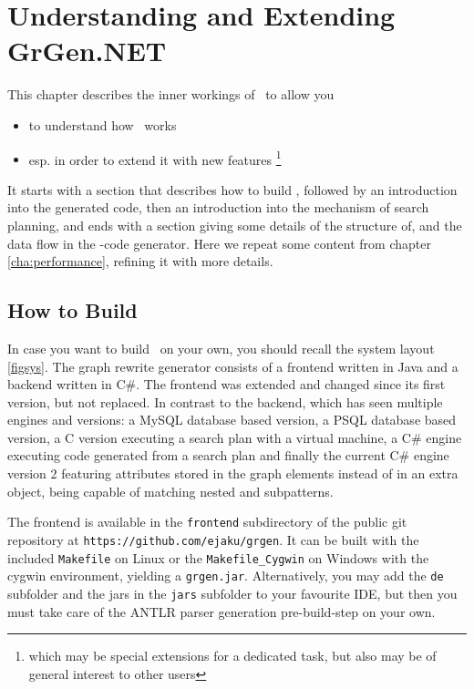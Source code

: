 \chapter{Understanding and Extending GrGen.NET} \label{cha:developing}

This chapter describes the inner workings of \GrG~to allow you
\begin{itemize}
\item to understand how \GrG~works
\item esp. in order to extend it with new features
\footnote{which may be special extensions for a dedicated task, but also may be of general interest to other users}
\end{itemize}
It starts with a section that describes how to build \GrG, followed by an introduction into the generated code, then an introduction into the mechanism of search planning, and ends with a section giving some details of the structure of, and the data flow in the \GrG-code generator.
Here we repeat some content from chapter \ref{cha:performance}, refining it with more details.

\section{How to Build}\label{sub:building}

In case you want to build \GrG~on your own, you should recall the system layout \ref{figsys}. 
The graph rewrite generator consists of a frontend written in Java and a backend written in C\#.
The frontend was extended and changed since its first version, but not replaced.
In contrast to the backend, which has seen multiple engines and versions: a MySQL database based version, a PSQL database based version, 
a C version executing a search plan with a virtual machine, a C\# engine executing code generated from a search plan and finally the current C\# engine version 2 featuring attributes stored in the graph elements instead of in an extra object, being capable of matching nested and subpatterns.

The frontend is available in the \texttt{frontend} subdirectory of the public git repository at \texttt{https://github.com/ejaku/grgen}.
It can be built with the included \texttt{Makefile} on Linux or the \texttt{Makefile\_Cygwin} on Windows with the cygwin environment, yielding a \texttt{grgen.jar}. 
Alternatively, you may add the \texttt{de} subfolder and the jars in the \texttt{jars} subfolder to your favourite IDE, but then you must take care of the ANTLR parser generation pre-build-step on your own. 

